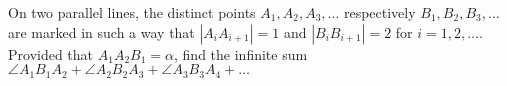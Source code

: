 On two parallel lines, the distinct points $A_1,A_2,A_3,\ldots $ respectively $B_1,B_2,B_3,\ldots $ are marked in such a way that $|A_iA_{i+1}|=1$ and $|B_iB_{i+1}|=2$ for $i=1,2,\ldots $. Provided that $A_1A_2B_1=\alpha$,  find the infinite sum $\angle A_1B_1A_2+\angle A_2B_2A_3+\angle A_3B_3A_4+\ldots $